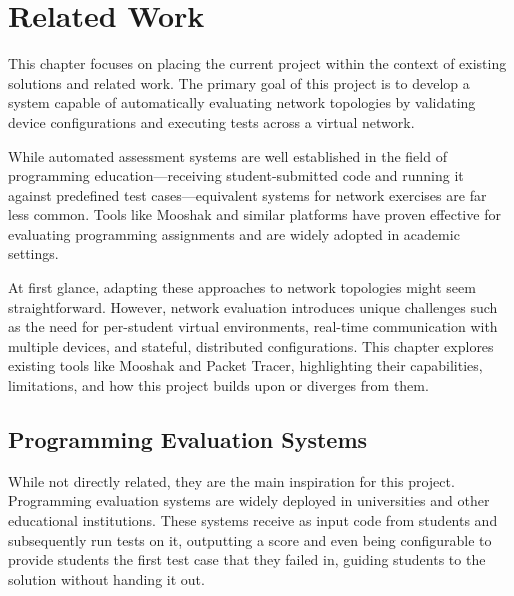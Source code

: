 
\chapter{Related Work}


\label{ChapterRelatedWork}


This chapter focuses on placing the current project within the context of existing solutions and related work. The primary 
goal of this project is to develop a system capable of automatically evaluating network topologies by validating device 
configurations and executing tests across a virtual network.

While automated assessment systems are well established in the field of programming education—receiving student-submitted 
code and running it against predefined test cases—equivalent systems for network exercises are far less common. Tools like 
Mooshak and similar platforms have proven effective for evaluating programming assignments and are widely adopted in academic 
settings.

At first glance, adapting these approaches to network topologies might seem straightforward. However, network evaluation 
introduces unique challenges such as the need for per-student virtual environments, real-time communication with multiple 
devices, and stateful, distributed configurations. This chapter explores existing tools like Mooshak and Packet Tracer, 
highlighting their capabilities, limitations, and how this project builds upon or diverges from them.

\section{Programming Evaluation Systems}
While not directly related, they are the main inspiration for this project. Programming evaluation systems are widely
deployed in universities and other educational institutions. These systems receive as input code from students and 
subsequently run tests on it, outputting a score and even being configurable to provide students the first test case that 
they failed in, guiding students to the solution without handing it out.

